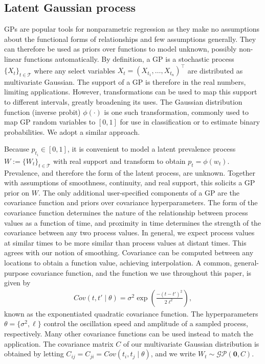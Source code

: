 \documentclass{article}
\begin{document}
\subsection{Latent Gaussian process}

GPs are popular tools for nonparametric regression as they make no assumptions about the functional forms of relationships and few assumptions generally. They can therefore be used as priors over functions to model unknown, possibly non-linear functions automatically. By definition, a GP is a stochastic process $\{X_t\}_{t\in\mathcal{T}}$ where any select variables $X_t=(X_{t_1},\dots ,X_{t_n})^{\intercal}$ are distributed as multivariate Gaussian. The support of a GP is therefore in the real numbers, limiting applications. However, transformations can be used to map this support to different intervals, greatly broadening its uses. The Gaussian distribution function (inverse probit) $\phi(\cdot)$ is one such transformation, commonly used to map GP random variables to $[0,1]$ for use in classification or to estimate binary probabilities. We adopt a similar approach. 

Because $p_{t_i}\in [0,1]$, it is convenient to model a latent prevalence process $W:=\{W_{t}\}_{t\in\mathcal{T}}$ with real support and transform to obtain $p_t = \phi(w_{t})$. Prevalence, and therefore the form of the latent process, are unknown. Together with assumptions of smoothness, continuity, and real support, this solicits a GP prior on $W$. The only additional user-specified components of a GP are the covariance function and priors over covariance hyperparameters. The form of the covariance function determines the nature of the relationship between process values as a function of time, and proximity in time determines the strength of the covariance between any two process values. In general, we expect process values at similar times to be more similar than process values at distant times. This agrees with our notion of smoothing. Covariance can be computed between any locations to obtain a function value, achieving interpolation. A common, general-purpose covariance function, and the function we use throughout this paper, is given by 
\begin{align} \label{eq_covariance}
Cov(t,t' \mid \theta) =\sigma^2 \exp\left(\frac{-(t-t')^2}{2\ell^2}\right),
\end{align}
known as the exponentiated quadratic covariance function. The hyperparameters $\theta = \{\sigma^2, \ell\}$ control the oscillation speed and amplitude of a sampled process, respectively. Many other covariance functions can be used instead to match the application. The covariance matrix $C$ of our multivariate Gaussian distribution is obtained by letting $C_{ij} =C_{ji} = Cov(t_i,t_j \mid \theta)$, and we write $W_t \sim \mathcal{GP}(\mathbf{0}, C)$. 
\end{document}
